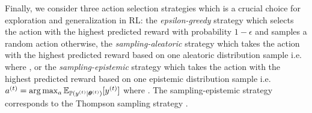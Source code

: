 Finally, we consider three action selection strategies which is a crucial choice for exploration and generalization in RL: the \emph{epsilon-greedy} strategy \cite{epsilon-greedy} which selects the action with the highest predicted reward with probability $1-\epsilon$ and samples a random action otherwise, the \emph{sampling-aleatoric} strategy which takes the action with the highest predicted reward based on one aleatoric distribution sample i.e.  where \smash{$\y\datatx \sim \prob(\y\datatx | \expparam\datatx)$}, or the \emph{sampling-epistemic} strategy which takes the action with the highest predicted reward based on one epistemic distribution sample i.e. $a^{(t)} = \arg\max_{a} \operatorname{\mathbb{E}}_{\operatorname{\mathbb{P}}(y^{(t)} | \bm{\theta}^{(t)})}[y^{(t)}]$ where \smash{$\expparam\datatx \sim \prior(\expparam\datatx | \priorparam\datatx)$}. The sampling-epistemic strategy corresponds to the Thompson sampling strategy \cite{thompson-sampling}.
